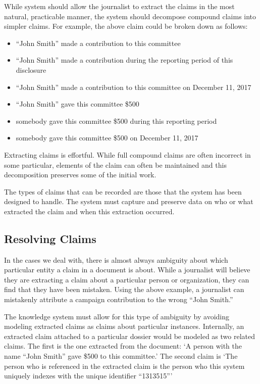 \documentclass[format=siggraph, review=true]{acmart}
\begin{document}
While system should allow the journalist to extract the claims in the
most natural, practicable manner, the system should decompose compound
claims into simpler claims. For example, the above
claim could be broken down as follows:

\begin{itemize}
\item ``John Smith'' made a contribution to this committee
\item ``John Smith'' made a contribution during the reporting period of this disclosure
\item ``John Smith'' made a contribution to this committee on December 11, 2017
\item ``John Smith'' gave this committee \$500
\item somebody gave this committee \$500 during this reporting period
\item somebody gave this committee \$500 on December 11, 2017
\end{itemize}

Extracting claims is effortful. While full compound claims are often
incorrect in some particular, elements of the claim can often be
maintained and this decomposition preserves some of the initial work.

The types of claims that can be recorded are those that the system has
been designed to handle. The system must capture and preserve data on
who or what extracted the claim and when this extraction occurred.

\subsection{Resolving Claims}
In the cases we deal with, there is almost always ambiguity about
which particular entity a claim in a document is about. While a
journalist will believe they are extracting a claim about a particular
person or organization, they can find that they have been
mistaken. Using the above example, a journalist can mistakenly
attribute a campaign contribution to the wrong ``John Smith.''

The knowledge system must allow for this type of ambiguity by avoiding
modeling extracted claims as claims about particular
instances. Internally, an extracted claim attached to a particular
dossier would be modeled as two related claims. The first is the one
extracted from the document: `A person with the name ``John Smith''
gave \$500 to this committee.' The second claim is `The person who is
referenced in the extracted claim is the person who this system
uniquely indexes with the unique identifier ``1313515'''
\end{document}
